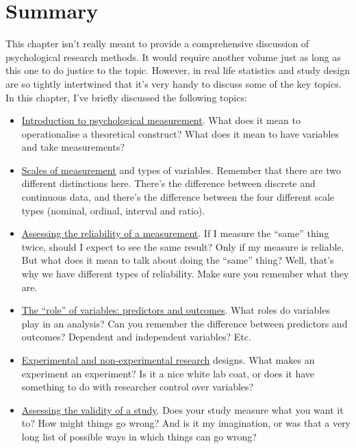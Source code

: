 \documentclass[
  a4paper,
]{book}
\providecommand{\tightlist}{%
  \setlength{\itemsep}{0pt}\setlength{\parskip}{0pt}}
\begin{document}
\section{Summary}\label{summary}

This chapter isn't really meant to provide a comprehensive discussion of
psychological research methods. It would require another volume just as
long as this one to do justice to the topic. However, in real life
statistics and study design are so tightly intertwined that it's very
handy to discuss some of the key topics. In this chapter, I've briefly
discussed the following topics:

\begin{itemize}
\tightlist
\item
  \hyperref[sec-Introduction-to-psychological-measurement]{Introduction
  to psychological measurement}. What does it mean to operationalise a
  theoretical construct? What does it mean to have variables and take
  measurements?
\item
  \hyperref[sec-Scales-of-measurement]{Scales of measurement} and types
  of variables. Remember that there are two different distinctions here.
  There's the difference between discrete and continuous data, and
  there's the difference between the four different scale types
  (nominal, ordinal, interval and ratio).
\item
  \hyperref[sec-Assessing-the-reliability-of-a-measurement]{Assessing
  the reliability of a measurement}. If I measure the ``same'' thing
  twice, should I expect to see the same result? Only if my measure is
  reliable. But what does it mean to talk about doing the ``same''
  thing? Well, that's why we have different types of reliability. Make
  sure you remember what they are.
\item
  \hyperref[the-role-of-variables-predictors-and-outcomes]{The ``role''
  of variables: predictors and outcomes}. What roles do variables play
  in an analysis? Can you remember the difference between predictors and
  outcomes? Dependent and independent variables? Etc.
\item
  \hyperref[experimental-and-non-experimental-research]{Experimental and
  non-experimental research} designs. What makes an experiment an
  experiment? Is it a nice white lab coat, or does it have something to
  do with researcher control over variables?
\item
  \hyperref[assessing-the-validity-of-a-study]{Assessing the validity of
  a study}. Does your study measure what you want it to? How might
  things go wrong? And is it my imagination, or was that a very long
  list of possible ways in which things can go wrong?
\end{itemize}
\end{document}
